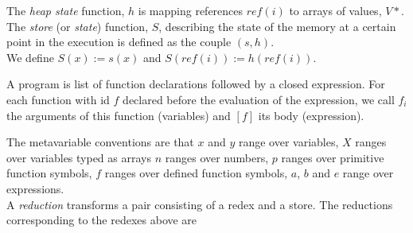 \documentclass[12pt,a4paper]{article}
\begin{document}
The \emph{heap state} function, $h$ is mapping references $ref(i)$ to arrays of values, $V*$.\\

The \emph{store} (or \emph{state}) function, $S$, describing the state of the memory at a certain point in the execution is defined as the couple $(s, h)$.\\
We define $S(x) := s(x)$ and $S(ref(i)) := h(ref(i))$.

A program is list of function declarations followed by a closed expression. For each function with id $f$ declared before the evaluation of the expression, we call $f_i$ the arguments of this function (variables) and $[f]$ its body (expression).

The metavariable conventions are that $x$ and $y$ range over variables, $X$ ranges over variables typed as arrays $n$ ranges over numbers, $p$ ranges over primitive function symbols, $f$ ranges over defined function symbols, $a$, $b$ and $e$ range over expressions. \\

A \emph{reduction} transforms a pair consisting of a redex and a store. The reductions corresponding to the redexes above are
\end{document}
